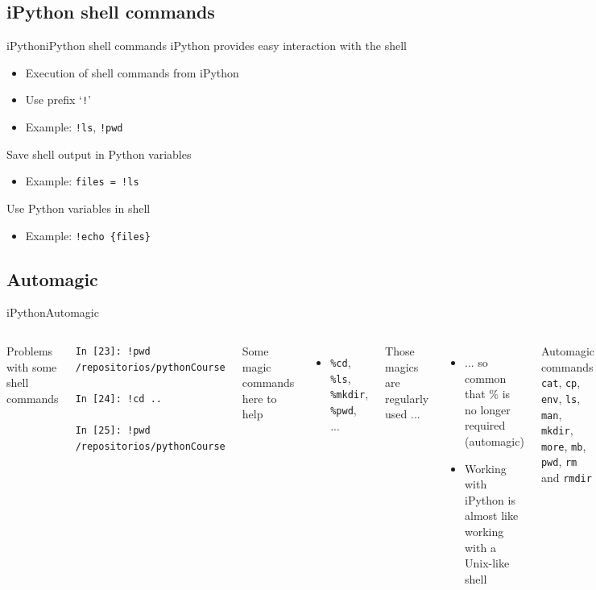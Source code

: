 \documentclass[10pt,compress]{beamer} %
\begin{document}
\subsection{iPython shell commands}
\begin{frame}{iPython}{iPython shell commands}
	iPython provides easy interaction with the shell
	\begin{itemize}
		\item Execution of shell commands from iPython
		\item Use prefix `\texttt{!}'
		\item Example: \texttt{!ls}, \texttt{!pwd}
	\end{itemize}
	Save shell output in Python variables
	\begin{itemize}
		\item Example: \texttt{files = !ls}
	\end{itemize}
	Use Python variables in shell
	\begin{itemize}
		\item Example: \texttt{!echo \{files\}}
	\end{itemize}
\end{frame}

\subsection{Automagic}

\begin{frame}[fragile]{iPython}{Automagic}
	\begin{columns}
	Problems with some shell commands
	\begin{alertblock}{}
	   \vspace{-0.2cm}
		\footnotesize{
		\begin{verbatim}
In [23]: !pwd
/repositorios/pythonCourse

In [24]: !cd ..

In [25]: !pwd
/repositorios/pythonCourse
\end{verbatim}
}
	\vspace{-0.2cm}
	\end{alertblock}
	Some magic commands here to help
	\begin{itemize}
		\item \texttt{\%cd}, \texttt{\%ls}, \texttt{\%mkdir}, \texttt{\%pwd}, ...
	\end{itemize}

	Those magics are regularly used ...
	\begin{itemize}
		\item ... so common that \% is no longer required (automagic)
		\item Working with iPython is almost like working with a Unix-like shell
	\end{itemize}
	\footnotesize{
	\begin{block}{\footnotesize{Automagic commands}}
\texttt{cat}, \texttt{cp}, \texttt{env}, \texttt{ls}, \texttt{man}, \texttt{mkdir}, \texttt{more}, \texttt{mb}, \texttt{pwd}, \texttt{rm} and \texttt{rmdir}
	\end{block}
	}
	\end{columns}

\end{frame}
\end{document}

